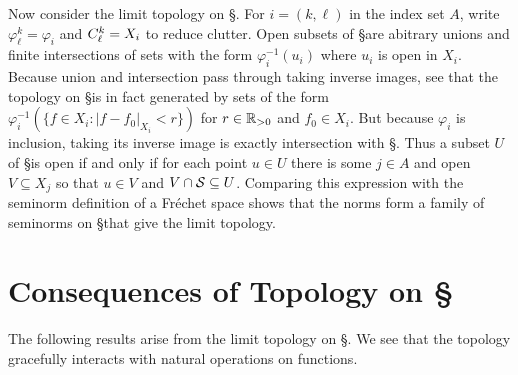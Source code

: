       Now consider the limit topology on \S.
      For $i=(k,\ell)$ in the index set $A$, write $\varphi^k_\ell = \varphi_i$ and $\Ckl=X_i$ to reduce clutter.
      Open subsets of \S are abitrary unions and finite intersections of sets with the form $\varphi_i^{-1}(u_i)$ where $u_i$ is open in $X_i$.
      Because union and intersection pass through taking inverse images, see that the topology on \S is in fact generated by sets of the form $\varphi_i^{-1}(\{f\in X_i:|f-f_0|_{X_i}<r\})$ for $r\in\R_{>0}$ and $f_0\in X_i$.
      But because $\varphi_i$ is inclusion, taking its inverse image is exactly intersection with \S.
      Thus a subset $U$ of \S is open if and only if for each point $u\in U$ there is some $j\in A$ and open $V\subseteq X_j$ so that $u\in V$ and $V\cap\S\subseteq U$.
      Comparing this expression with the seminorm definition of a Fr\'echet space shows that the \Ckl norms form a family of seminorms on \S that give the limit topology.

    \section{Consequences of Topology on \S}
      The following results arise from the limit topology on \S.
      We see that the topology gracefully interacts with natural operations on functions.

